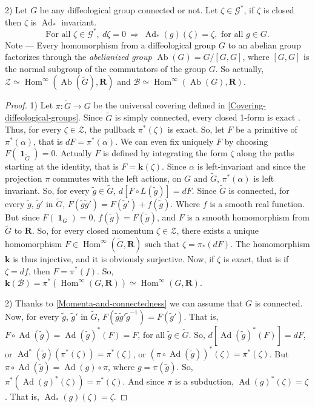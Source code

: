 \documentclass[10pt,reqno,twoside]{amsart}
\newcommand{\RR}{\mathbf{R}}
\newcommand{\cB}{\mathcal{B}}
\newcommand{\cG}{\mathcal{G}}
\newcommand{\cZ}{\mathcal{Z}}
\DeclareMathOperator{\id}{\mathbf{1}}
\DeclareMathOperator{\Hom}{Hom}
\DeclareMathOperator{\Ab}{Ab}
\DeclareMathOperator{\Ad}{Ad}
\newcommand{\ek}{\mathbf{k}}
\renewcommand{\L}{L}
\theoremstyle{plain}
\theoremstyle{definition}
\begin{document}
  2) Let $G$ be any diffeological group connected or not.
  Let $\zeta \in \cG^*$,
  if $\zeta$ is closed then $\zeta$ is $\Ad_*$ invariant.
  $$
    \mbox{For all } \zeta \in \cG^*, \ d\zeta = 0 \
    \Rightarrow \ \Ad_*(g)(\zeta) = \zeta, \mbox{ for all } g \in G.
    $$
  {\sc Note} --- Every homomorphism from a diffeological group $G$ to an abelian group factorizes through the {\em abelianized group} $\Ab(G) = G/[G,G]$,
  where $[G,G]$ is the normal subgroup of the commutators of the group $G$.
  So actually,
  $\cZ \simeq \Hom^\infty(\Ab(\tilde G),\RR)$ and $\cB \simeq \Hom^\infty(\Ab(G),\RR)$.
  \begin{proof}
    1) Let $\pi : \tilde G \to G$ be the universal covering defined in \ref{Covering-diffeological-groups}.
    Since $\tilde G$ is simply connected,
    every closed 1-form is exact \cite{Piz05}.
    Thus,
    for every $\zeta \in \cZ$,
    the pullback $\pi^*(\zeta)$ is exact.
    So,
    let $F$ be a primitive of $\pi^*(\alpha)$,
    that is $dF = \pi^*(\alpha)$.
    We can even fix uniquely $F$ by choosing $F(\id_{\tilde G}) = 0$.
    Actually $F$ is defined by integrating the form $\zeta$ along the paths starting at the identity,
    that is $F = \ek(\zeta)$.
    Since $\alpha$ is left-invariant and since the projection $\pi$ commutes with the left actions,
    on $G$ and $\tilde G$,
    $\pi^*(\alpha)$ is left invariant.
    So,
    for every $\tilde g \in \tilde G$,
    $d[F \circ \L(\tilde g)] = dF$.
    Since $\tilde G$ is connected,
    for every $\tilde g$, $\tilde g'$ in $\tilde G$,
    $F(\tilde g \tilde g') = F(\tilde g') + f(\tilde g)$.
    Where $f$ is a smooth real function.
    But since $F(\id_G) = 0$,
    $f(\tilde g) = F(\tilde g)$,
    and $F$ is a smooth homomorphism from $\tilde G$ to $\RR$.
    So,
    for every closed momentum $\zeta \in \cZ$,
    there exists a unique homomorphism $F \in \Hom^\infty(\tilde G, \RR)$ such that $\zeta = \pi_*(dF)$.
    The homomorphism $\ek$ is thus injective,
    and it is obviously surjective.
    Now,
    if $\zeta$ is exact,
    that is if $\zeta = df$,
    then $F = \pi^*(f)$.
    So,
    $\ek(\cB) = \pi^*(\Hom^\infty(G,\RR)) \simeq \Hom^\infty(G,\RR)$.
    
    2) Thanks to \ref{Momenta-and-connectedness} we can assume that $G$ is connected.
    Now,
    for every $\tilde g$, $\tilde g'$ in $\tilde G$,
    $F(\tilde g \tilde g' \tilde g^{-1}) = F(\tilde g')$.
    That is,
    $F \circ \Ad(\tilde g) = \Ad(\tilde g)^*(F) = F$,
    for all $\tilde g \in \tilde G$.
    So,
    $d[\Ad(\tilde g)^*(F)] = dF$,
    or $\Ad^*(\tilde g)(\pi^*(\zeta)) = \pi^*(\zeta)$,
    or $(\pi \circ \Ad(\tilde g))^*(\zeta) = \pi^*(\zeta)$.
    But $\pi \circ \Ad(\tilde g) = \Ad(g) \circ \pi$,
    where $g = \pi(\tilde g)$.
    So,
    $\pi^*(\Ad(g)^*(\zeta)) = \pi^*(\zeta)$.
    And since $\pi$ is a subduction,
    $\Ad(g)^*(\zeta) = \zeta$.
    That is,
    $\Ad_*(g)(\zeta) = \zeta$.
  \end{proof}
  
\end{document}
